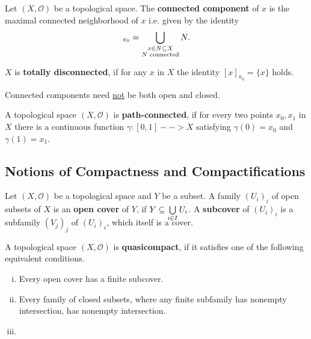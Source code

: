\begin{lemma}
\end{lemma}

\begin{definition}
	Let $(X, \mathcal{O})$ be a topological space. The \textbf{connected component} of $x$ is the maximal connected neighborhood of $x$ i.e. given by the identity
	\begin{equation*}
		[x]_{\pi_0} = \Union \limits_{\substack{x \in N \subseteq X\\N\text{ connected}}} N.
	\end{equation*}

	$X$ is \textbf{totally disconnected}, if for any $x$ in $X$ the identity $[x]_{\pi_0} = \{x\}$ holds.
\end{definition}

\begin{remark}
	Connected components need \underline{not} be both open and closed. 
\end{remark}

\begin{lemma}
\end{lemma}

\begin{definition}
	A topological space $(X, \mathcal{O})$ is \textbf{path-connected}, if for every two points $x_0, x_1$ in $X$ there is a continuous function $\gamma: [0,1] --> X$ satisfying $\gamma(0) = x_0$ and $\gamma(1) = x_1$.
\end{definition}

\newpage
\subsection{Notions of Compactness and Compactifications}

\begin{definition}
	Let $(X,\mathcal{O})$ be a topological space and $Y$ be a subset. A family $(U_i)_i$ of open subsets of $X$ is an \textbf{open cover} of $Y$, if $Y \subseteq \smash{\bigcup \limits_{i \in I} U_i}$. A \textbf{subcover} of $(U_i)_i$ is a subfamily $(V_j)_j$ of $(U_i)_i$, which itself is a cover.
\end{definition}

\begin{definition}
	A topological space $(X,\mathcal{O})$ is \textbf{quasicompact}, if it satisfies one of the following equivalent conditions.
	\begin{enumerate}[(i)]
		\item{
			Every open cover has a finite subcover.
		}
		\item{
			Every family of closed subsets, where any finite subfamily has nonempty intersection, has nonempty intersection.
		}
		\item{
		}
	\end{enumerate}
\end{definition}

